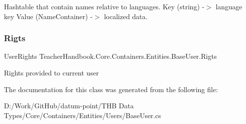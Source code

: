 Hashtable that contain names relative to languages. Key (string) -\/$>$ language key Value (Name\+Container) -\/$>$ localized data. 

\mbox{\label{class_teacher_handbook_1_1_core_1_1_containers_1_1_entities_1_1_base_user_a0aeebd3854d7996435cdb2fc691c2bc3}} 
\subsubsection{\texorpdfstring{Rigts}{Rigts}}
{\footnotesize\ttfamily User\+Rights Teacher\+Handbook.\+Core.\+Containers.\+Entities.\+Base\+User.\+Rigts\hspace{0.3cm}{\ttfamily [get]}}



Rights provided to current user 



The documentation for this class was generated from the following file\+:\begin{DoxyCompactItemize}
\item 
D\+:/\+Work/\+Git\+Hub/datum-\/point/\+T\+H\+B Data Types/\+Core/\+Containers/\+Entities/\+Users/Base\+User.\+cs\end{DoxyCompactItemize}
